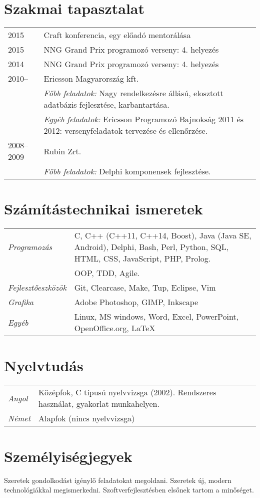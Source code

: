 \documentclass[a4paper,10pt]{article}
\newcommand{\pont}[1]{\emph{#1}}
\begin{document}
\section*{Szakmai tapasztalat}
\begin{tabular}{lp{10cm}}
 2015&Craft konferencia, egy előadó mentorálása\\
 2015&NNG Grand Prix programozó verseny: 4. helyezés\\
 2014&NNG Grand Prix programozó verseny: 4. helyezés\\
 2010--&Ericsson Magyarország kft.\\
  &\emph{Főbb feladatok:} Nagy rendelkezésre állású, elosztott adatbázis fejlesztése, karbantartása.\\
  &\emph{Egyéb feladatok:} Ericsson Programozó Bajnokság 2011 és 2012: versenyfeladatok tervezése és ellenőrzése.\\
 2008--2009&Rubin Zrt.\\
  &\emph{Főbb feladatok:} Delphi komponensek fejlesztése.
\end{tabular}

\section*{Számítástechnikai ismeretek}
\begin{tabular}{lp{12cm}}
 \pont{Programozás}&C, C++ (C++11, C++14, Boost), Java (Java SE, Android), Delphi, Bash, Perl, Python, SQL, HTML, CSS, JavaScript, PHP, Prolog.\\
 &OOP, TDD, Agile.\\
 \pont{Fejlesztőeszközök}&Git, Clearcase, Make, Tup, Eclipse, Vim\\
 \pont{Grafika}&Adobe Photoshop, GIMP, Inkscape\\
 \pont{Egyéb}&Linux, MS windows, Word, Excel, PowerPoint, OpenOffice.org, LaTeX
\end{tabular}

\section*{Nyelvtudás}
\begin{tabular}{ll}
 \pont{Angol}&Középfok, C típusú nyelvvizsga (2002). Rendszeres használat, gyakorlat munkahelyen.\\
 \pont{Német}&Alapfok (nincs nyelvvizsga)
\end{tabular}

\section*{Személyiségjegyek}
Szeretek gondolkodást igénylő feladatokat megoldani. Szeretek új, modern technológiákkal megismerkedni. Szoftverfejlesztésben elsőnek tartom a minőséget.
\end{document}
